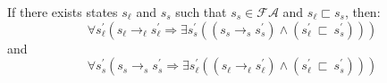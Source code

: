 \begin{lemma}
\label{lem:access}
%
If there exists states $s_\ell$ and $s_s$ such that $s_s \in \mathcal{FA}$ and $s_\ell \sqsubset s_s$, then:
\begin{equation}
\forall s_\ell^\prime ( s_\ell \rightarrow_\ell s_\ell^\prime \Rightarrow \exists s_s^\prime( (s_s \rightarrow_s s_s^\prime )\wedge (s_\ell^\prime\ \sqsubset\ s_s^\prime ))  )
\end{equation}
and
\begin{equation}
\forall s_s^\prime ( s_s \rightarrow_s s_s^\prime\Rightarrow \exists s_\ell^\prime( (s_\ell \rightarrow_\ell s_\ell^\prime )\wedge (s_\ell^\prime\ \sqsubset\ s_s^\prime ))  )
\end{equation}
\end{lemma}

